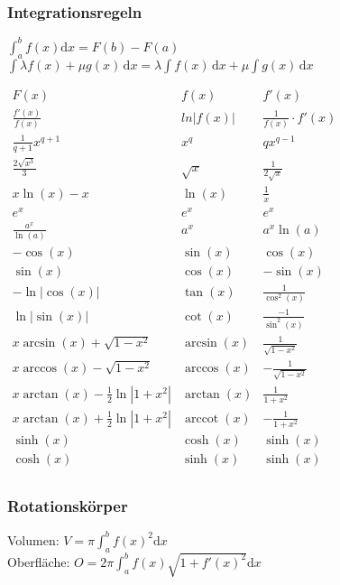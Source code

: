\documentclass[6pt,a4paper]{scrartcl}
\DeclareMathOperator{\arccot}{arccot}
\begin{document}
\begin{multicols*}{4}
\subsubsection{Integrationsregeln}
$\int_a^b f(x) \mathrm dx = F(b) - F(a)$\\
$\int\lambda f(x)+\mu g(x) \, \mathrm dx=\lambda\int f(x) \, \mathrm dx + \mu\int g(x) \, \mathrm dx$

\everymath{\displaystyle}	%
\begin{math}\renewcommand{\arraystretch}{1.8}
\begin{array}{c|c|c}
F(x) & f(x) & f'(x) \\ \hline 
\frac{f'(x)}{f(x)}&ln|f(x)|&\frac{1}{f(x)}\cdot f'(x)\\
\frac{1}{q+1}x^{q+1} & x^q & qx^{q-1} \\
\frac{2\sqrt{x^3}}{3} & \sqrt{x} & \frac{1}{2\sqrt{x}}\\
x\ln(x) -x & \ln(x) & \textstyle \frac{1}{x}\\
e^x & e^x & e^x \\
\frac{a^x}{\ln(a)} & a^x & a^x \ln(a) \\
-\cos(x) & \sin(x) & \cos(x)\\
\sin(x) & \cos(x) & -\sin(x)\\
-\ln |\cos(x)| & \tan(x) & \frac{1}{\cos^2(x)} \\
\ln |\sin(x)| & \cot(x) & \frac{-1}{\sin^2(x)} \\
x\arcsin (x)+\sqrt{1-x^2} & \arcsin(x) & \frac{1}{\sqrt{1-x^2}}\\
x\arccos (x)-\sqrt{1-x^2} & \arccos(x) & -\frac{1}{\sqrt{1-x^2}}\\
x\arctan (x)-\frac{1}{2} \ln \left| 1+ x^2 \right| & \arctan (x) & \frac{1}{1+x^2} \\
x\arctan (x)+\frac{1}{2} \ln \left| 1+ x^2 \right| & \arccot (x) & -\frac{1}{1+x^2} \\
\sinh(x) & \cosh(x) & \sinh (x) \\
\cosh(x) & \sinh(x) & \sinh(x)\\
\end{array}
\end{math}
\everymath{\textstyle}


\subsubsection{Rotationskörper}
Volumen: $V = \pi \int_a^b f(x)^2 \mathrm dx$\\
Oberfläche: $O = 2 \pi \int_a^b f(x) \sqrt{1 + f'(x)^2} \mathrm dx$


\end{multicols*}
\end{document}
